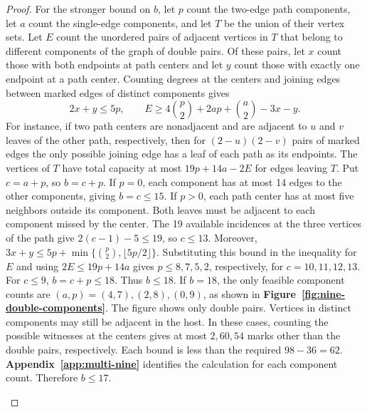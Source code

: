 \documentclass[preprint,11pt,numbers]{elsarticle-arxiv}
\numberwithin{equation}{section}
\theoremstyle{definition}
\begin{document}
\begin{proof}
For the stronger bound on $b$, let $p$ count the two-edge
path components, let $a$ count the single-edge components,
and let $T$ be the union of their vertex sets. Let $E$ count the
unordered pairs of adjacent vertices in $T$ that belong to different
components of the graph of double pairs. Of these pairs, let $x$
count those with both endpoints at path centers and let $y$ count
those with exactly one endpoint at a path center.
Counting degrees at the centers and joining edges between
marked edges of distinct components gives
\[
 2x+y\le5p,\qquad
 E\ge4\binom{p}{2}+2ap+\binom{a}{2}-3x-y.
\]
For instance, if two path centers are nonadjacent and are
adjacent to $u$ and $v$ leaves of the other path, respectively,
then for $(2-u)(2-v)$ pairs of marked edges the only possible
joining edge has a leaf of each path as its endpoints. The vertices of $T$ have
total capacity at most $19p+14a-2E$ for edges leaving $T$.
Put $c=a+p$, so $b=c+p$. If $p=0$, each component has at most
14 edges to the other components, giving $b=c\leq15$. If $p>0$,
each path center has at most five neighbors outside its component.
Both leaves must be adjacent to each component missed by the center.
The 19 available incidences at the three vertices of the path give
$2(c-1)-5\leq19$, so $c\leq13$. Moreover,
$3x+y\leq5p+\min\{\binom{p}{2},\lfloor5p/2\rfloor\}$.
Substituting this bound in the inequality for $E$ and using
$2E\leq19p+14a$ gives $p\leq8,7,5,2$, respectively, for
$c=10,11,12,13$. For $c\leq9$, $b=c+p\leq18$. Thus $b\leq18$.
If $b=18$, the only feasible component counts are
$(a,p)=(4,7),(2,8),(0,9)$, as shown in
\textbf{Figure~\ref{fig:nine-double-components}}. The figure shows
only double pairs. Vertices in distinct components may still be
adjacent in the host. In these cases, counting the
possible witnesses at the centers gives at most $2,60,54$
marks other than the double pairs, respectively. Each bound
is less than the required $98-36=62$.
\textbf{Appendix~\ref{app:multi-nine}} identifies the calculation
for each component count. Therefore $b\leq17$.
\begin{figure}[!htbp]
\centering
\begingroup
\newcommand{\ninePair}{\begin{tikzpicture}[x=1mm,y=1mm,baseline=-.6mm]
\draw[marked edge,line width=.5pt] (0,0) to[bend left=23] (2.5,0)
 (0,0) to[bend right=23] (2.5,0);
\fill (0,0) circle[radius=.30mm] (2.5,0) circle[radius=.30mm];
\end{tikzpicture}}
\newcommand{\ninePath}{\begin{tikzpicture}[x=1mm,y=1mm,baseline=-.6mm]
\foreach \x/\y in {0/2.5,2.5/5}{
}
\end{tikzpicture}}
\end{figure}
\end{proof}
\end{document}
